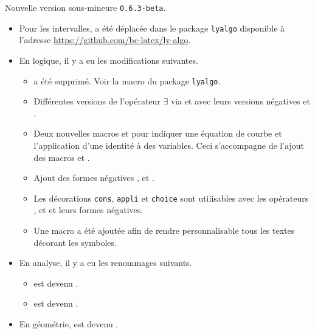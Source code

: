 Nouvelle version sous-mineure \verb+0.6.3-beta+.

\begin{itemize}[itemsep=.5em]
    \item Pour les intervalles,  a été déplacée dans le package \verb+lyalgo+ disponible à l'adresse \url{https://github.com/bc-latex/ly-algo}.


    \item En logique, il y a eu les modifications suivantes.
    \begin{itemize}[itemsep=.5em]
        \item {} a été supprimé. Voir la macro  du package \verb+lyalgo+.

        \item Différentes versions de l'opérateur $\exists$ via  et  avec leurs versions négatives  et .

        \item Deux nouvelles macros  et  pour indiquer une équation de courbe et l'application d'une identité à des variables. Ceci s'accompagne de l'ajout des macros  et .

        \item Ajout des formes négatives ,  et .

        \item Les décorations \verb+cons+, \verb+appli+ et \verb+choice+ sont utilisables avec les opérateurs ,  et  et leurs formes négatives.

        \item Une macro  a été ajoutée afin de rendre personnalisable tous les textes décorant les symboles.
    \end{itemize}


    \item En analyse, il y a eu les renommages suivants.
    \begin{itemize}[itemsep=.5em]
        \item {} est devenu .

        \item {} est devenu .
    \end{itemize}


    \item En géométrie,  est devenu .
\end{itemize}
